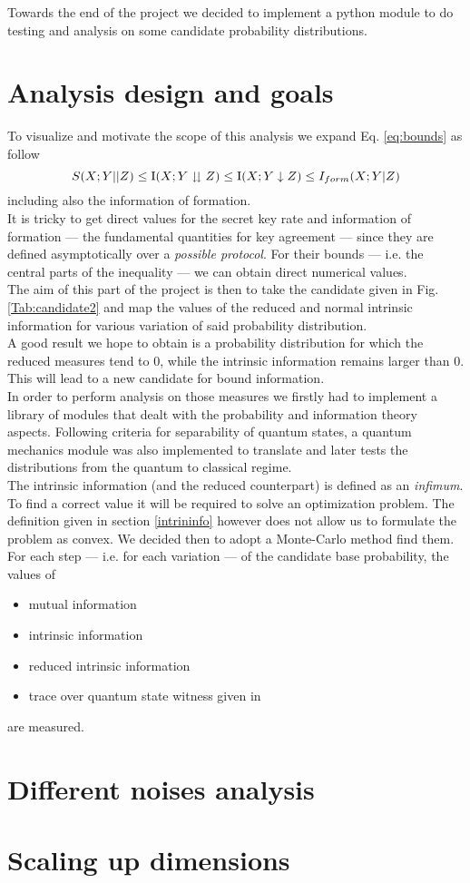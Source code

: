 Towards the end of the project we decided to implement a python module to do testing and analysis on some candidate probability distributions.
\section{Analysis design and goals}
    To visualize and motivate the scope of this analysis we expand Eq. \ref{eq:bounds} as follow
    \begin{equation}
    	S(X;Y||Z) \leq \operatorname{I}(X;Y\downdownarrows Z) \leq \operatorname{I}(X;Y\downarrow Z) \leq I_{form} (X;Y|Z)
    \end{equation}
    including also the information of formation.\\
    It is tricky to get direct values for the secret key rate and information of formation --- the fundamental quantities for key agreement --- since they are defined asymptotically over a \textit{possible protocol}. 
    For their bounds --- i.e. the central parts of the inequality --- we can obtain direct numerical values. \\
    The aim of this part of the project is then to take the candidate given in Fig. \ref{Tab:candidate2} and map the values of the reduced and normal intrinsic information for various variation of said probability distribution.\\
    
    A good result we hope to obtain is a probability distribution for which the reduced measures tend to $0$, while the intrinsic information remains larger than $0$. This will lead to a new candidate for bound information.\\
    
    In order to perform analysis on those measures we firstly had to implement a library of modules that dealt with the probability and information theory aspects.
    Following criteria for separability of quantum states, a quantum mechanics module was also implemented to translate and later tests the distributions from the quantum to classical regime.\\
    The intrinsic information (and the reduced counterpart) is defined as an \emph{infimum}. 
    To find a correct value it will be required to solve an optimization problem. 
    The definition given in section \ref{intrininfo} however does not allow us to formulate the problem as convex.
    We decided then to adopt a Monte-Carlo method find them.\\
     
    For each step --- i.e. for each variation --- of the candidate base probability, the values of 
    \begin{itemize}
    	\item	mutual information
    	\item	intrinsic information
    	\item	reduced intrinsic information
    	\item	trace over quantum state witness given in \cite{DPS04}
    \end{itemize}
    are measured.
\section{Different noises analysis}
\section{Scaling up dimensions}
